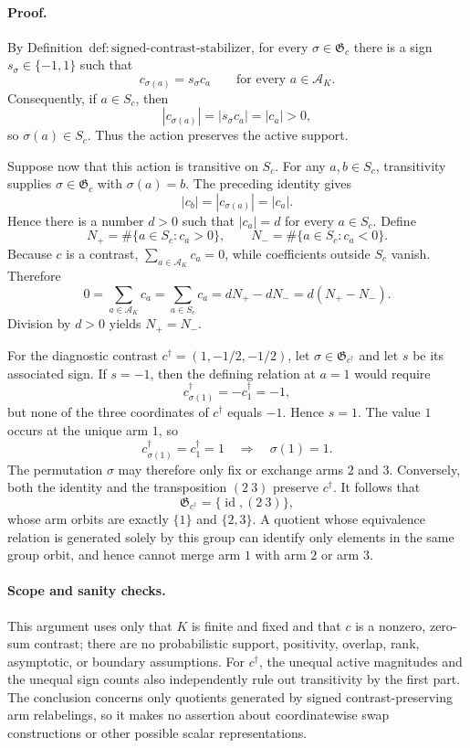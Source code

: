 \paragraph{Proof.}
By Definition~\(\mathrm{def{:}signed\text{-}contrast\text{-}stabilizer}\), for every \(\sigma\in\mathfrak G_c\) there is a sign \(s_\sigma\in\{-1,1\}\) such that
\[
c_{\sigma(a)}=s_\sigma c_a
\qquad\text{for every }a\in\mathcal A_K.
\]
Consequently, if \(a\in S_c\), then
\[
|c_{\sigma(a)}|=|s_\sigma c_a|=|c_a|>0,
\]
so \(\sigma(a)\in S_c\). Thus the action preserves the active support.

Suppose now that this action is transitive on \(S_c\). For any \(a,b\in S_c\), transitivity supplies \(\sigma\in\mathfrak G_c\) with \(\sigma(a)=b\). The preceding identity gives
\[
|c_b|=|c_{\sigma(a)}|=|c_a|.
\]
Hence there is a number \(d>0\) such that \(|c_a|=d\) for every \(a\in S_c\). Define
\[
N_+=\#\{a\in S_c:c_a>0\},
\qquad
N_-=\#\{a\in S_c:c_a<0\}.
\]
Because \(c\) is a contrast, \(\sum_{a\in\mathcal A_K}c_a=0\), while coefficients outside \(S_c\) vanish. Therefore
\[
0=\sum_{a\in\mathcal A_K}c_a
 =\sum_{a\in S_c}c_a
 =dN_+-dN_-
 =d(N_+-N_-).
\]
Division by \(d>0\) yields \(N_+=N_-\).

For the diagnostic contrast \(c^\dagger=(1,-1/2,-1/2)\), let \(\sigma\in\mathfrak G_{c^\dagger}\) and let \(s\) be its associated sign. If \(s=-1\), then the defining relation at \(a=1\) would require
\[
c^\dagger_{\sigma(1)}=-c^\dagger_1=-1,
\]
but none of the three coordinates of \(c^\dagger\) equals \(-1\). Hence \(s=1\). The value \(1\) occurs at the unique arm \(1\), so
\[
c^\dagger_{\sigma(1)}=c^\dagger_1=1
\quad\Longrightarrow\quad
\sigma(1)=1.
\]
The permutation \(\sigma\) may therefore only fix or exchange arms \(2\) and \(3\). Conversely, both the identity and the transposition \((2\ 3)\) preserve \(c^\dagger\). It follows that
\[
\mathfrak G_{c^\dagger}=\{\operatorname{id},(2\ 3)\},
\]
whose arm orbits are exactly \(\{1\}\) and \(\{2,3\}\). A quotient whose equivalence relation is generated solely by this group can identify only elements in the same group orbit, and hence cannot merge arm \(1\) with arm \(2\) or arm \(3\).

\paragraph{Scope and sanity checks.}
This argument uses only that \(K\) is finite and fixed and that \(c\) is a nonzero, zero-sum contrast; there are no probabilistic support, positivity, overlap, rank, asymptotic, or boundary assumptions. For \(c^\dagger\), the unequal active magnitudes and the unequal sign counts also independently rule out transitivity by the first part. The conclusion concerns only quotients generated by signed contrast-preserving arm relabelings, so it makes no assertion about coordinatewise swap constructions or other possible scalar representations.
